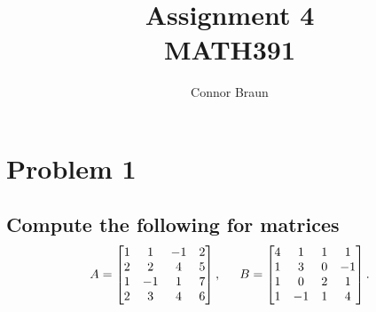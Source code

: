 \documentclass[11pt, letterpaper]{article}
\begin{document}
\title{Assignment 4\\\normalsize MATH391}
\author{Connor Braun}

\allowdisplaybreaks

\maketitle
\section*{Problem 1}
\subsection*{\normalfont Compute the following for matrices
\begin{align*}
    A=
    \begin{bmatrix}
        1 & 1 & -1& 2\\
        2 & 2 & 4 & 5\\
        1 & -1 & 1 & 7\\
        2 & 3 & 4 & 6
    \end{bmatrix}
    ,\indent B=
    \begin{bmatrix}
    4 & 1 & 1 & 1\\
    1 & 3 & 0 & -1\\
    1 & 0 & 2 & 1\\
    1 & -1 & 1 & 4    
    \end{bmatrix}.
\end{align*}}
\end{document}
